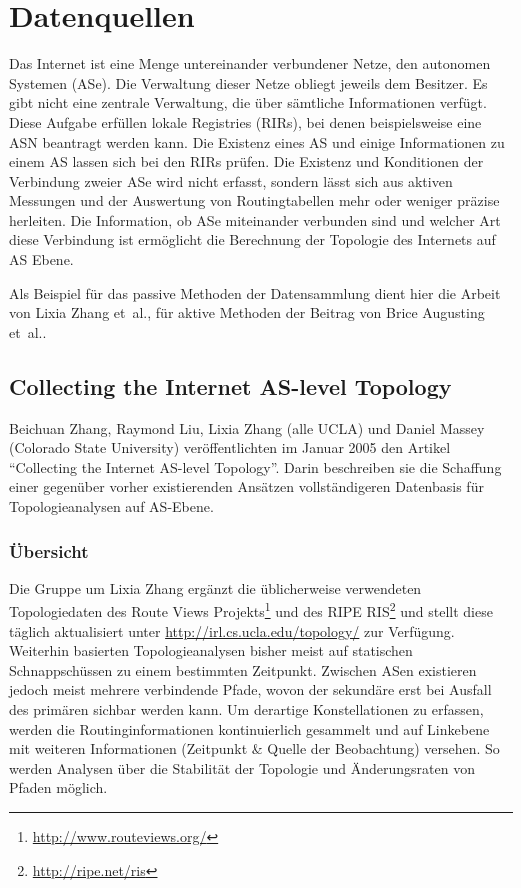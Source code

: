 \section{Datenquellen}\label{sec:datenquellen}

Das Internet ist eine Menge untereinander verbundener Netze, den autonomen Systemen (ASe).
Die Verwaltung dieser Netze obliegt jeweils dem Besitzer. Es gibt nicht eine zentrale Verwaltung, die über sämtliche Informationen verfügt.
Diese Aufgabe erfüllen lokale Registries (RIRs), bei denen beispielsweise eine ASN beantragt werden kann.
Die Existenz eines AS und einige Informationen zu einem AS lassen sich bei den RIRs prüfen.
Die Existenz und Konditionen der Verbindung zweier ASe wird nicht erfasst, sondern lässt sich aus aktiven Messungen und der Auswertung von Routingtabellen mehr oder weniger präzise herleiten.
Die Information, ob ASe miteinander verbunden sind und welcher Art diese Verbindung ist ermöglicht die Berechnung der Topologie des Internets auf AS Ebene.

Als Beispiel für das passive Methoden der Datensammlung dient hier die Arbeit von Lixia Zhang et\ al., für aktive Methoden der Beitrag von Brice Augusting et\ al..

\subsection{Collecting the Internet AS-level Topology~\cite{Zhang:2005:CIA:1052812.1052825}}

Beichuan Zhang, Raymond Liu, Lixia Zhang (alle UCLA) und Daniel Massey (Colorado State University) veröffentlichten im Januar 2005 den Artikel "`Collecting the Internet AS-level Topology"'.
Darin beschreiben sie die Schaffung einer gegenüber vorher existierenden Ansätzen vollständigeren Datenbasis für Topologieanalysen auf AS-Ebene.

\subsubsection{Übersicht}
Die Gruppe um Lixia Zhang ergänzt die üblicherweise verwendeten Topologiedaten des Route Views Projekts\footnote{\url{http://www.routeviews.org/}} und des RIPE RIS\footnote{\url{http://ripe.net/ris}} und stellt diese täglich aktualisiert unter \url{http://irl.cs.ucla.edu/topology/} zur Verfügung.
Weiterhin basierten Topologieanalysen bisher meist auf statischen Schnappschüssen zu einem bestimmten Zeitpunkt.
Zwischen ASen existieren jedoch meist mehrere verbindende Pfade, wovon der sekundäre erst bei Ausfall des primären sichbar werden kann.
Um derartige Konstellationen zu erfassen, werden die Routinginformationen kontinuierlich gesammelt und auf Linkebene mit weiteren Informationen (Zeitpunkt \& Quelle der Beobachtung) versehen.
So werden Analysen über die Stabilität der Topologie und Änderungsraten von Pfaden möglich.

